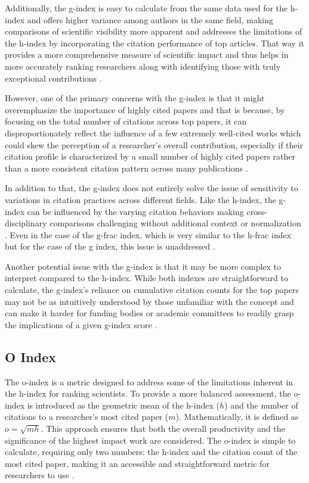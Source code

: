Additionally, the g-index is easy to calculate from the same data used for the
h-index and offers higher variance among authors in the same field, making
comparisons of scientific visibility more apparent and addresses the
limitations of the h-index by incorporating the citation performance of top
articles. That way it provides a more comprehensive measure of scientific
impact and thus helps in more accurately ranking researchers along with
identifying those with truly exceptional contributions
\cite{egghe2008mathematical, egghe2006theory, egghe2006improvement}.

However, one of the primary concerns with the g-index is that it might
overemphasize the importance of highly cited papers and that is because, by
focusing on the total number of citations across top papers, it can
disproportionately reflect the influence of a few extremely well-cited works which
could skew the perception of a researcher's overall contribution, especially if
their citation profile is characterized by a small number of highly cited
papers rather than a more consistent citation pattern across many publications
\cite{egghe2008mathematical}.

In addition to that, the g-index does not entirely solve the issue of
sensitivity to variations in citation practices across different fields. Like
the h-index, the g-index can be influenced by the varying citation behaviors
making cross-disciplinary comparisons challenging without additional context or
normalization \cite{egghe2008mathematical, egghe2006theory,
    egghe2006improvement}. Even in the case of the g-frac index, which is very
similar to the h-frac index but for the case of the g index, this issue is
unaddressed \cite{egghe2008mathematical}.

Another potential issue with the g-index is that it may be more complex to
interpret compared to the h-index. While both indexes are straightforward to
calculate, the g-index's reliance on cumulative citation counts for the top
papers may not be as intuitively understood by those unfamiliar with the
concept and can make it harder for funding bodies or academic committees to
readily grasp the implications of a given g-index score
\cite{egghe2008mathematical, egghe2006improvement}.

\subsection{O Index}
The o-index is a metric designed to address some of the limitations inherent in
the h-index for ranking scientists. To provide a more balanced assessment, the
o-index is introduced as the geometric mean of the h-index ($h$) and the number
of citations to a researcher's most cited paper ($m$). Mathematically, it is
defined as $o = \sqrt{mh}$. This approach ensures that both the overall
productivity and the significance of the highest impact work are considered.
The o-index is simple to calculate, requiring only two numbers: the h-index and
the citation count of the most cited paper, making it an accessible and
straightforward metric for researchers to use \cite{dorogovtsev2015ranking}.

